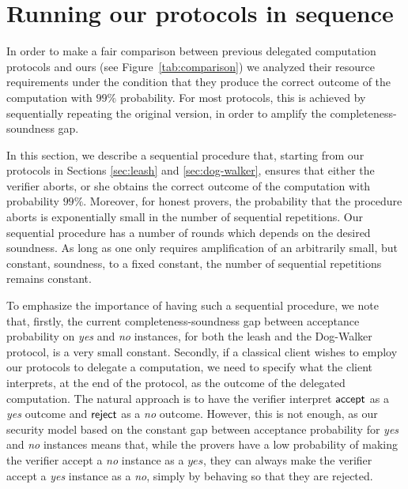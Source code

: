 \documentclass[11pt,letter]{article}
\theoremstyle{remark}
\theoremstyle{definition}
\begin{document}
\section{Running our protocols in sequence}
\label{sec:sequential}


In order to make a fair comparison between previous delegated computation protocols and ours (see Figure~\ref{tab:comparison}) we analyzed their resource requirements under the condition that they produce the correct outcome of the computation with $99\%$ probability. For most protocols, this is achieved by sequentially repeating the original version, in order to amplify the completeness-soundness gap. 

In this section, we describe a sequential procedure that, starting from our protocols in Sections \ref{sec:leash} and \ref{sec:dog-walker}, ensures that either the verifier aborts, or she obtains the correct outcome of the computation with probability $99\%$. Moreover, for honest provers, the probability that the procedure aborts is exponentially small in the number of sequential repetitions. Our sequential procedure has a number of rounds which depends on the desired soundness. As long as one only requires amplification of an arbitrarily small, but constant, soundness, to a fixed constant, the number of sequential repetitions remains constant.

To emphasize the importance of having such a sequential procedure, we note that, firstly, the current completeness-soundness gap between acceptance probability on \textit{yes} and \textit{no} instances, for both the leash and the Dog-Walker protocol, is a very small constant. Secondly, if a classical client wishes to employ our protocols to delegate a computation, we need to specify what the client interprets, at the end of the protocol, as the outcome of the delegated computation. The natural approach is to have the verifier interpret $\sf accept$ as a \textit{yes} outcome and $\sf reject$ as a \textit{no} outcome. However, this is not enough, as our security model based on the constant gap between acceptance probability for \textit{yes} and \textit{no} instances means that, while the provers have a low probability of making the verifier accept a \textit{no} instance as a $\textit{yes}$, they can always make the verifier accept a \textit{yes} instance as a \textit{no}, simply by behaving so that they are rejected.
\end{document}
